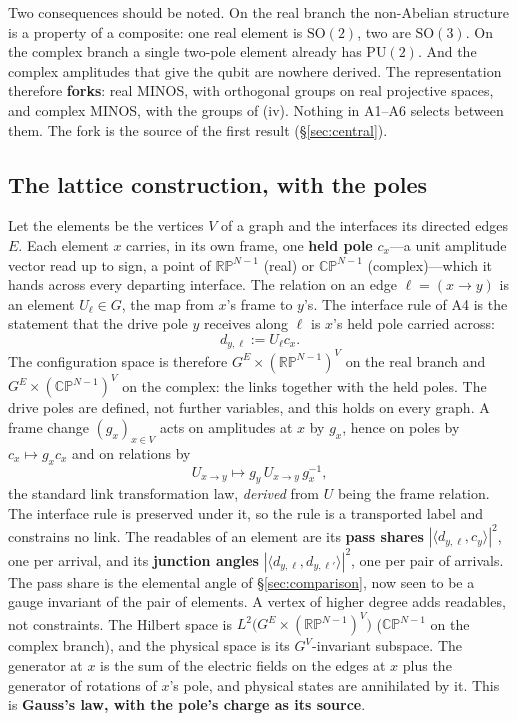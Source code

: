 \documentclass[11pt,a4paper]{article}
\theoremstyle{plain}
\theoremstyle{definition}
\theoremstyle{remark}
\newcommand{\RP}{\mathbb{RP}}
\newcommand{\CP}{\mathbb{CP}}
\newcommand{\SO}{\mathrm{SO}}
\newcommand{\PU}{\mathrm{PU}}
\begin{document}
Two consequences should be noted. On the real branch the non-Abelian structure is a property of a composite: one real element is $\SO(2)$, two are $\SO(3)$. On the complex branch a single two-pole element already has $\PU(2)$. And the complex amplitudes that give the qubit are nowhere derived. The representation therefore \textbf{forks}: real MINOS, with orthogonal groups on real projective spaces, and complex MINOS, with the groups of (iv). Nothing in A1--A6 selects between them. The fork is the source of the first result (\S\ref{sec:central}).

\subsection{The lattice construction, with the poles}\label{sec:construction}

Let the elements be the vertices $V$ of a graph and the interfaces its directed edges $E$. Each element $x$ carries, in its own frame, one \textbf{held pole} $c_x$---a unit amplitude vector read up to sign, a point of $\RP^{N-1}$ (real) or $\CP^{N-1}$ (complex)---which it hands across every departing interface. The relation on an edge $\ell=(x\to y)$ is an element $U_\ell\in G$, the map from $x$'s frame to $y$'s. The interface rule of A4 is the statement that the drive pole $y$ receives along $\ell$ is $x$'s held pole carried across:
\begin{equation}
d_{y,\ell}:=U_\ell c_x .
\end{equation}
The configuration space is therefore $G^E\times(\RP^{N-1})^V$ on the real branch and $G^E\times(\CP^{N-1})^V$ on the complex: the links together with the held poles. The drive poles are defined, not further variables, and this holds on every graph. A frame change $(g_x)_{x\in V}$ acts on amplitudes at $x$ by $g_x$, hence on poles by $c_x\mapsto g_xc_x$ and on relations by
\begin{equation}
U_{x\to y}\mapsto g_y\,U_{x\to y}\,g_x^{-1},
\end{equation}
the standard link transformation law, \emph{derived} from $U$ being the frame relation. The interface rule is preserved under it, so the rule is a transported label and constrains no link. The readables of an element are its \textbf{pass shares} $|\langle d_{y,\ell},c_y\rangle|^2$, one per arrival, and its \textbf{junction angles} $|\langle d_{y,\ell},d_{y,\ell'}\rangle|^2$, one per pair of arrivals. The pass share is the elemental angle of \S\ref{sec:comparison}, now seen to be a gauge invariant of the pair of elements. A vertex of higher degree adds readables, not constraints. The Hilbert space is $L^2\big(G^E\times(\RP^{N-1})^V\big)$ ($\CP^{N-1}$ on the complex branch), and the physical space is its $G^V$-invariant subspace. The generator at $x$ is the sum of the electric fields on the edges at $x$ plus the generator of rotations of $x$'s pole, and physical states are annihilated by it. This is \textbf{Gauss's law, with the pole's charge as its source}.
\end{document}
